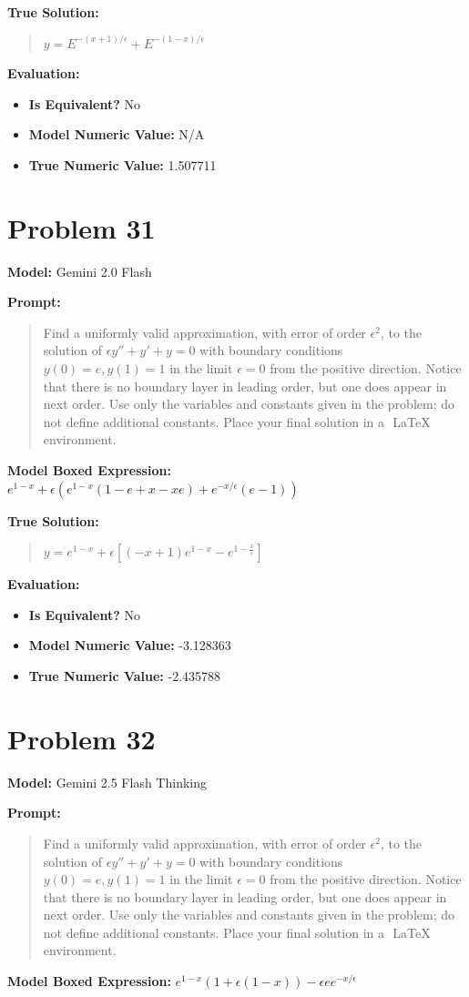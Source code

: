 \documentclass{article}
\begin{document}
\textbf{True Solution:}
\begin{quote}
$y = E^{-(x+1)/\epsilon}+ E^{-(1-x)/\epsilon}$
\end{quote}

\textbf{Evaluation:}
\begin{itemize}
\item \textbf{Is Equivalent?} No
\item \textbf{Model Numeric Value:} N/A
\item \textbf{True Numeric Value:} 1.507711
\end{itemize}
\vspace{1cm}
\section*{Problem 31}
\textbf{Model:} Gemini 2.0 Flash

\textbf{Prompt:}
\begin{quote}
Find a uniformly valid approximation, with error of order $\epsilon^2$, to the solution of $\epsilon y'' + y' +y = 0$ with boundary conditions $y(0) = e, y(1) = 1$ in the limit $\epsilon = 0$ from the positive direction. Notice that there is no boundary layer in leading order, but one does appear in next order. Use only the variables and constants given in the problem; do not define additional constants. Place your final solution in a $\boxed{}$ LaTeX environment.
\end{quote}
\textbf{Model Boxed Expression:} $e^{1-x} + \epsilon (e^{1-x}(1-e+x-xe) + e^{-x/\epsilon}(e-1))$

\textbf{True Solution:}
\begin{quote}
$y = e^{1-x} + \epsilon[(-x+1)e^{1-x} -e^{1-\frac{x}{\epsilon}}]$
\end{quote}

\textbf{Evaluation:}
\begin{itemize}
\item \textbf{Is Equivalent?} No
\item \textbf{Model Numeric Value:} -3.128363
\item \textbf{True Numeric Value:} -2.435788
\end{itemize}
\vspace{1cm}
\section*{Problem 32}
\textbf{Model:} Gemini 2.5 Flash Thinking

\textbf{Prompt:}
\begin{quote}
Find a uniformly valid approximation, with error of order $\epsilon^2$, to the solution of $\epsilon y'' + y' +y = 0$ with boundary conditions $y(0) = e, y(1) = 1$ in the limit $\epsilon = 0$ from the positive direction. Notice that there is no boundary layer in leading order, but one does appear in next order. Use only the variables and constants given in the problem; do not define additional constants. Place your final solution in a $\boxed{}$ LaTeX environment.
\end{quote}
\textbf{Model Boxed Expression:} $e^{1-x}(1 + \epsilon(1-x)) - \epsilon e e^{-x/\epsilon}$
\end{document}
